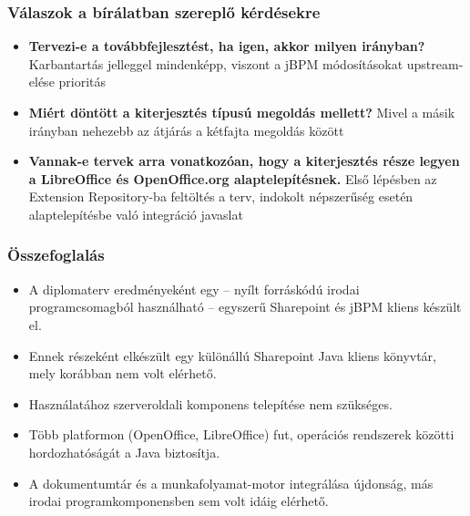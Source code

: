 \documentclass{beamer}
\begin{document}
\begin{frame}
\frametitle{Válaszok a bírálatban szereplő kérdésekre}
\begin{itemize}
\item \textbf{Tervezi-e a továbbfejlesztést, ha igen, akkor milyen irányban?}
Karbantartás jelleggel mindenképp, viszont a jBPM módosításokat upstream-elése
prioritás
\item \textbf{Miért döntött a kiterjesztés típusú megoldás mellett?} Mivel a
másik irányban nehezebb az átjárás a kétfajta megoldás között
\item \textbf{Vannak-e tervek arra vonatkozóan, hogy a kiterjesztés része
legyen a LibreOffice és OpenOffice.org alaptelepítésnek.} Első lépésben az
Extension Repository-ba feltöltés a terv, indokolt népszerűség esetén
alaptelepítésbe való integráció javaslat

\end{itemize}
\end{frame}

\begin{frame}
\frametitle{Összefoglalás}
\begin{itemize}
\item A diplomaterv eredményeként egy -- nyílt forráskódú irodai
programcsomagból használható -- egyszerű Sharepoint és jBPM kliens készült el.
\item Ennek részeként elkészült egy különállú Sharepoint Java kliens könyvtár,
mely korábban nem volt elérhető.
\item Használatához szerveroldali komponens telepítése nem szükséges.
\item Több platformon (OpenOffice, LibreOffice) fut, operációs rendszerek
közötti hordozhatóságát a Java biztosítja.
\item A dokumentumtár és a munkafolyamat-motor integrálása újdonság, más irodai
programkomponensben sem volt idáig elérhető.
\end{itemize}
\end{frame}
\end{document}
